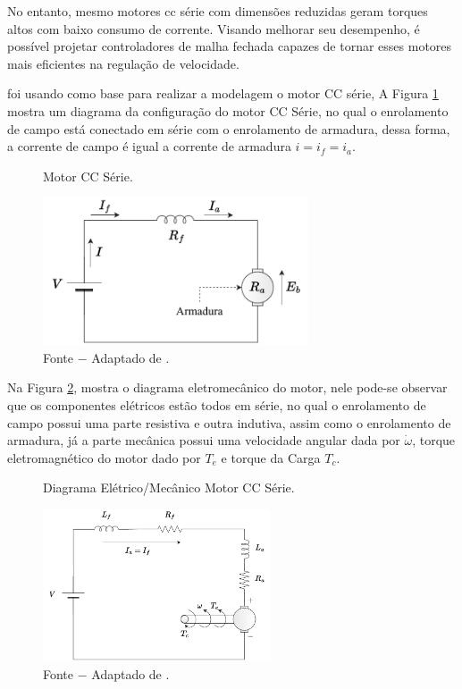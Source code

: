 No entanto, mesmo motores cc série com dimensões reduzidas geram torques altos com baixo consumo de corrente. Visando melhorar seu desempenho, é possível projetar controladores de malha fechada capazes de tornar esses motores mais eficientes na regulação de velocidade.

\cite{jesus} foi usando como base para realizar a modelagem o motor CC série, A Figura \ref{fig4:image_02} mostra um diagrama da configuração do motor CC Série, no qual o enrolamento de campo está conectado em série com o enrolamento de armadura, dessa forma, a  corrente de campo é igual a corrente de armadura $ i = i_f = i_a$.


\begin{figure}[!h]
	\centering
	\caption{Motor CC Série.}
	\includegraphics[width=0.7\textwidth]{Capitulos/4_desenvolvimento/4_figuras/esquema_motor_cc.pdf}
	\caption*{Fonte $-$ Adaptado de \cite{jesus}.}
	\label{fig4:image_02}
\end{figure}

Na Figura \ref{fig4:image_03}, mostra o diagrama eletromecânico do motor, nele pode-se observar que os componentes elétricos estão todos em série, no qual o enrolamento de campo possui uma parte resistiva e outra indutiva, assim como o enrolamento de armadura, já a parte mecânica possui uma velocidade angular dada por $\dot{\omega}$, torque eletromagnético do motor dado por $T_e$ e torque da Carga $T_c$.


\begin{figure}[!h]
	\centering
	\caption{Diagrama Elétrico/Mecânico Motor CC Série.}
	\includegraphics[width=0.6\textwidth]{Capitulos/4_desenvolvimento/4_figuras/diagrama_motor_cc.pdf}
	\caption*{Fonte $-$ Adaptado de \cite{jesus}.}
	\label{fig4:image_03}
\end{figure}



